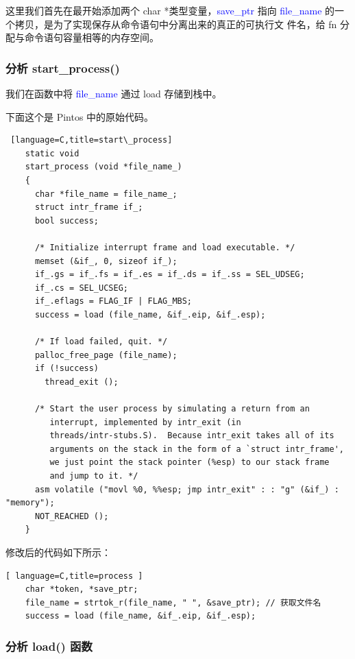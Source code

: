 \documentclass[14pt,a4paper,UTF8,twoside]{article}
\renewcommand{\texttt}[1]{\textcolor{blue}{\ttfamily #1}}
\begin{document}
\begin{ctt}
这里我们首先在最开始添加两个 char *类型变量，\texttt{*save\_ptr} 指向
\texttt{file\_name} 的一个拷贝，是为了实现保存从命令语句中分离出来的真正的可执行文
件名，给 fn 分配与命令语句容量相等的内存空间。
\end{ctt}

\subsubsection{分析 start\_process()}

我们在函数中将 \texttt{file\_name} 通过 load 存储到栈中。

下面这个是 Pintos 中的原始代码。

\begin{lstlisting} [language=C,title=start\_process]
    static void
    start_process (void *file_name_)
    {
      char *file_name = file_name_;
      struct intr_frame if_;
      bool success;
    
      /* Initialize interrupt frame and load executable. */
      memset (&if_, 0, sizeof if_);
      if_.gs = if_.fs = if_.es = if_.ds = if_.ss = SEL_UDSEG;
      if_.cs = SEL_UCSEG;
      if_.eflags = FLAG_IF | FLAG_MBS;
      success = load (file_name, &if_.eip, &if_.esp);
    
      /* If load failed, quit. */
      palloc_free_page (file_name);
      if (!success) 
        thread_exit ();
    
      /* Start the user process by simulating a return from an
         interrupt, implemented by intr_exit (in
         threads/intr-stubs.S).  Because intr_exit takes all of its
         arguments on the stack in the form of a `struct intr_frame',
         we just point the stack pointer (%esp) to our stack frame
         and jump to it. */
      asm volatile ("movl %0, %%esp; jmp intr_exit" : : "g" (&if_) : "memory");
      NOT_REACHED ();
    }
\end{lstlisting}

修改后的代码如下所示：

\begin{lstlisting}[ language=C,title=process ]
    char *token, *save_ptr;
    file_name = strtok_r(file_name, " ", &save_ptr); // 获取文件名
    success = load (file_name, &if_.eip, &if_.esp);
\end{lstlisting}

\subsubsection{分析 load() 函数}
\end{document}
